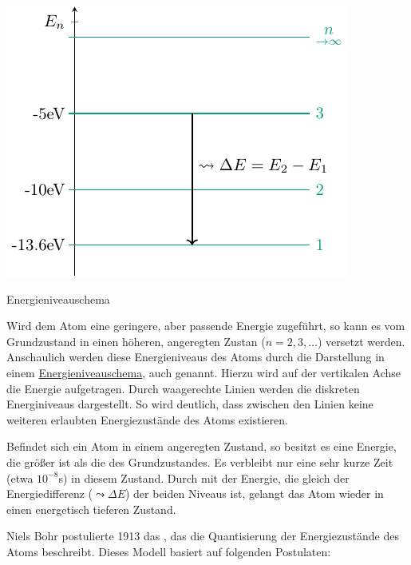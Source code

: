\documentclass{tuftebook}
\begin{document}
    \begin{marginfigure}
        \centering
        \includegraphics[width=\linewidth]{figures/energieniveaus.pdf}
        \caption{Energieniveauschema}
        \label{fig:energieniveauschema}
    \end{marginfigure}
    Wird dem Atom eine geringere, aber passende Energie zugeführt, so kann es vom Grundzustand in einen höheren, angeregten Zustan ($n=2,3,\ldots$) versetzt werden. Anschaulich werden diese Energieniveaus des Atoms durch die Darstellung in einem \hyperref[fig:energieniveauschema]{Energieniveauschema}, auch  genannt.
    Hierzu wird auf der vertikalen Achse die Energie aufgetragen. Durch waagerechte Linien werden die diskreten Energiniveaus dargestellt. So wird deutlich, dass zwischen den Linien keine weiteren erlaubten Energiezustände des Atoms existieren. 

    \begin{definition}
        \vspace{-1em}
        Befindet sich ein Atom in einem angeregten Zustand, so besitzt es eine Energie, die größer ist als die des Grundzustandes. Es verbleibt nur eine sehr kurze Zeit (etwa $10^{-8}$s) in diesem Zustand. Durch  mit der Energie, die gleich der Energiedifferenz ($\leadsto\Delta E$) der beiden Niveaus ist, gelangt das Atom wieder in einen energetisch tieferen Zustand.
    \end{definition}
    Niels Bohr postulierte 1913 das , das die Quantisierung der Energiezustände des Atoms beschreibt. Dieses Modell basiert auf folgenden Postulaten:
\end{document}
